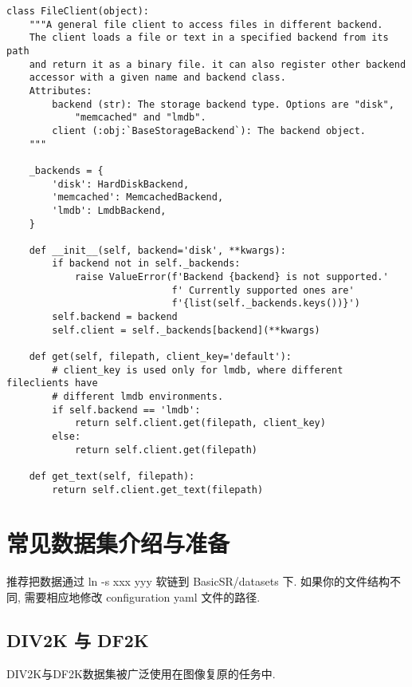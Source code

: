 \documentclass[../main.tex]{subfiles}
\begin{document}
\begin{verbatim}
class FileClient(object):
    """A general file client to access files in different backend.
    The client loads a file or text in a specified backend from its path
    and return it as a binary file. it can also register other backend
    accessor with a given name and backend class.
    Attributes:
        backend (str): The storage backend type. Options are "disk",
            "memcached" and "lmdb".
        client (:obj:`BaseStorageBackend`): The backend object.
    """

    _backends = {
        'disk': HardDiskBackend,
        'memcached': MemcachedBackend,
        'lmdb': LmdbBackend,
    }

    def __init__(self, backend='disk', **kwargs):
        if backend not in self._backends:
            raise ValueError(f'Backend {backend} is not supported.'
                             f' Currently supported ones are' 
                             f'{list(self._backends.keys())}')
        self.backend = backend
        self.client = self._backends[backend](**kwargs)

    def get(self, filepath, client_key='default'):
        # client_key is used only for lmdb, where different fileclients have
        # different lmdb environments.
        if self.backend == 'lmdb':
            return self.client.get(filepath, client_key)
        else:
            return self.client.get(filepath)

    def get_text(self, filepath):
        return self.client.get_text(filepath)
\end{verbatim}


\section{常见数据集介绍与准备}\label{data_preparation:dataset}

推荐把数据通过 ln -s xxx yyy 软链到 BasicSR/datasets 下. 如果你的文件结构不同, 需要相应地修改 configuration yaml 文件的路径.

\subsection{DIV2K 与 DF2K}

DIV2K与DF2K数据集被广泛使用在图像复原的任务中.
\end{document}
